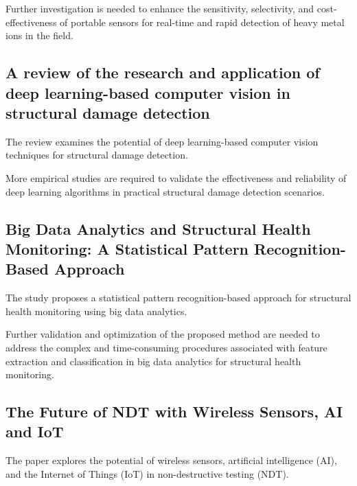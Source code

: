 \documentclass[journal, a4paper]{IEEEtran}
\begin{document}
\begin{description}[style=standard, font=\normalfont]
  \item[Research gap:] Further investigation is needed to enhance the sensitivity, selectivity, and cost-effectiveness of portable sensors for real-time and rapid detection of heavy metal ions in the field.
\end{description}


\subsection{A review of the research and application of deep learning-based computer vision in structural damage detection} 
The review examines the potential of deep learning-based computer vision techniques for structural damage detection. 
\begin{description}[style=standard, font=\normalfont]
  \item[Research gap:] More empirical studies are required to validate the effectiveness and reliability of deep learning algorithms in practical structural damage detection scenarios.
\end{description}


\subsection{Big Data Analytics and Structural Health Monitoring: A Statistical Pattern Recognition-Based Approach}
The study proposes a statistical pattern recognition-based approach for structural health monitoring using big data analytics. 

\begin{description}[style=standard, font=\normalfont]
  \item[Research gap:] Further validation and optimization of the proposed method are needed to address the complex and time-consuming procedures associated with feature extraction and classification in big data analytics for structural health monitoring.
\end{description}


\subsection{The Future of NDT with Wireless Sensors, AI and IoT}
The paper explores the potential of wireless sensors, artificial intelligence (AI), and the Internet of Things (IoT) in non-destructive testing (NDT). 
\end{document}
